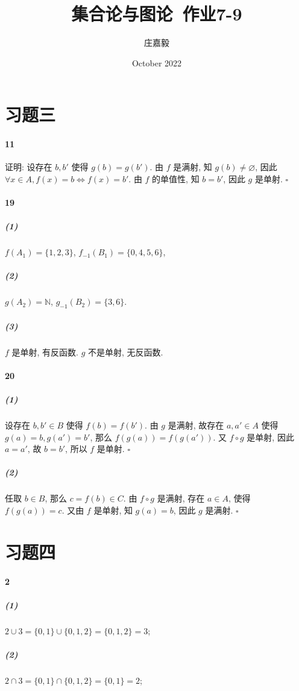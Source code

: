 \documentclass{ctexart}
\title{集合论与图论~作业7-9}
\author{庄嘉毅}
\date{October 2022}
\def\QED{\hfill $\square$}
\def\equ{\mathrel{\Leftrightarrow}}
\begin{document}
\maketitle

\section*{习题三}

\paragraph*{11} 证明: 设存在 $b,b'$ 使得 $g(b)=g(b')$.
由 $f$ 是满射, 知 $g(b)\ne \varnothing$, 因此
$\forall x\in A, f(x)=b \equ f(x)=b'$. 由 $f$ 的单值性,
知 $b=b'$, 因此 $g$ 是单射. \QED

\paragraph*{19}

\subparagraph*{(1)} $f(A_1)=\{1,2,3\}$,
$f_{-1}(B_1)=\{0, 4, 5, 6\}$,

\subparagraph*{(2)} $g(A_2)=\mathbb{N}$,
$g_{-1}(B_2)=\{3,6\}$.

\subparagraph*{(3)} $f$ 是单射, 有反函数. $g$ 不是单射, 无反函数.

\paragraph*{20}

\subparagraph*{(1)} 设存在 $b, b'\in B$ 使得 $f(b)=f(b')$.
由 $g$ 是满射, 故存在 $a,a'\in A$ 使得 $g(a)=b, g(a')=b'$,
那么 $f(g(a))=f(g(a'))$.
又 $f\circ g$ 是单射, 因此 $a=a'$, 故 $b=b'$, 所以 $f$ 是单射. \QED

\subparagraph*{(2)} 任取 $b\in B$, 那么 $c=f(b)\in C$.
由 $f\circ g$ 是满射, 存在 $a\in A$, 使得 $f(g(a))=c$.
又由 $f$ 是单射, 知 $g(a)=b$, 因此 $g$ 是满射. \QED

\section*{习题四}

\paragraph*{2}

\subparagraph*{(1)} $2\cup 3=\{0,1\}\cup \{0,1,2\}=\{0,1,2\}=3$;

\subparagraph*{(2)} $2\cap 3=\{0,1\}\cap \{0,1,2\}=\{0,1\}=2$;
\end{document}
